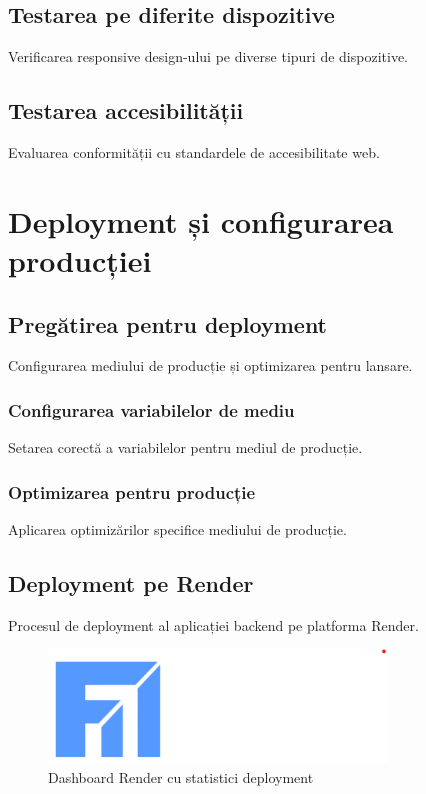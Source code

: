 \documentclass[12pt,a4paper]{report}
\begin{document}
\subsection{Testarea pe diferite dispozitive}

Verificarea responsive design-ului pe diverse tipuri de dispozitive.

\subsection{Testarea accesibilității}

Evaluarea conformității cu standardele de accesibilitate web.

\section{Deployment și configurarea producției}

\subsection{Pregătirea pentru deployment}

Configurarea mediului de producție și optimizarea pentru lansare.

\subsubsection{Configurarea variabilelor de mediu}

Setarea corectă a variabilelor pentru mediul de producție.

\subsubsection{Optimizarea pentru producție}

Aplicarea optimizărilor specifice mediului de producție.

\subsection{Deployment pe Render}

Procesul de deployment al aplicației backend pe platforma Render.

\begin{figure}[H]
\centering
\includegraphics[width=0.8\textwidth]{logo_uaic.png}
\caption{Dashboard Render cu statistici deployment}
\label{fig:render_dashboard}
\end{figure}
\end{document}
